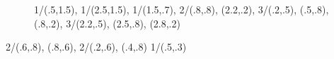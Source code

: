 \documentclass{article}
\begin{document}
  \begin{figure}
  \end{figure}

  \begin{figure}
    {%
      {1/{(.5,1.5)}},%
      {1/{(2.5,1.5)}},%
      {1/{(1.5,.7)}},%
      {2/{(.8,.8), (2.2,.2)}},%
      {3/{(.2,.5), (.5,.8), (.8,.2)}},%
      {3/{(2.2,.5), (2.5,.8), (2.8,.2)}}%
    }{}
  \end{figure}

  {%
    {2/{(.6,.8), (.8,.6)}},%
    {2/{(.2,.6), (.4,.8)}}%
  }%
  {%
    {1/{(.5,.3)}}%
  }
\end{document}
